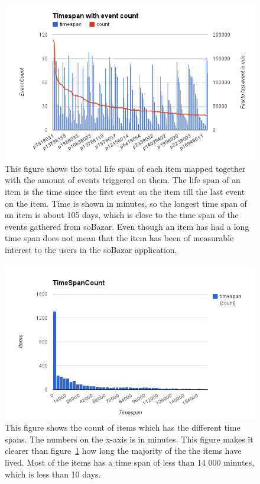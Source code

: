 
    \begin{figure}[H]
        \includegraphics[width=5in]{image/item-timespan-event-count.png}
        \centering
        \caption[Life time of items mapped with event count]{This figure shows the total life span of each item mapped together with the amount of events triggered on them.
        The life span of an item is the time since the first event on the item till the last event on the item.
        Time is shown in minutes, so the longest time span of an item is about 105 days, which is close to the time span of the events gathered from soBazar.
        Even though an item has had a long time span does not mean that the item has been of measurable interest to the users in the soBazar application.}
        \label{figure:itemTimeSpanEventCount}
    \end{figure}


    \begin{figure}[H]
        \includegraphics[width=5in]{image/time-span-count.png}
        \centering
        \caption[Count of the different time spans of the items]{This figure shows the count of items which has the different time spans.
        The numbers on the x-axis is in minutes.
        This figure makes it clearer than figure~\ref{figure:itemTimeSpanEventCount} how long the majority of the the items have lived.
        Most of the items has a time span of less than 14 000 minutes, which is less than 10 days.}
    \end{figure}

